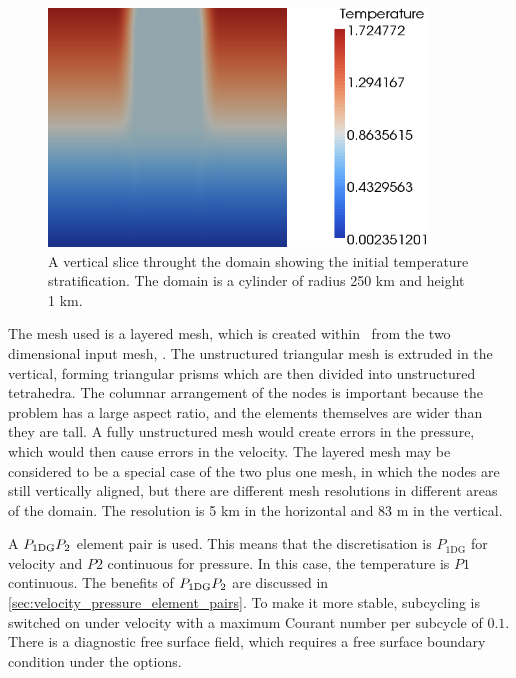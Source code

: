 \begin{figure}[h]
\begin{center}
\includegraphics[width=10cm]{examples_images/restratification_after_oodc/rousset-init.png}
\caption{A vertical slice throught the domain showing the initial temperature stratification. The domain is a cylinder of radius 250 km and height 1 km. }
\label{fig:rousset-init}
\end{center}
\end{figure}


The mesh used is a layered mesh, which is created within \fluidity\ from the two dimensional input mesh, . The unstructured triangular mesh is extruded in the vertical, forming triangular prisms which are then divided into unstructured tetrahedra. The columnar arrangement of the nodes is important because the problem has a large aspect ratio, and the elements themselves are wider than they are tall. A fully unstructured mesh would create errors in the pressure, which would then cause errors in the velocity. The layered mesh may be considered to be a special case of the two plus one mesh, in which the nodes are still vertically aligned, but there are different mesh resolutions in different areas of the domain. The resolution is 5 km in the horizontal and 83 m in the vertical. 


A $P_{1\mathrm{DG}}P_2$ element pair is used. This means that the discretisation is $P_{1\mathrm{DG}}$ for velocity and  $P2$ continuous for pressure. In this case, the temperature is $P1$ continuous. The benefits of $P_{1\mathrm{DG}}P_2$ are discussed in \ref{sec:velocity_pressure_element_pairs}.  To make it more stable, subcycling is switched on under velocity with a maximum Courant number per subcycle of $0.1$. There is a diagnostic free surface field, which requires a free surface boundary condition under the  options.

